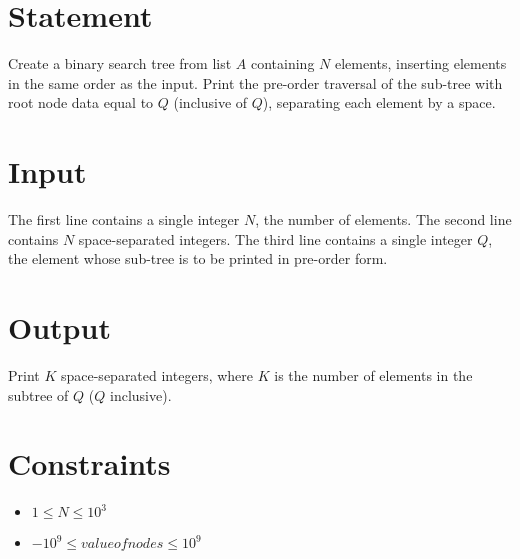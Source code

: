 \documentclass{article}
\begin{document}
\section*{Statement}

Create a binary search tree from list $A$ containing $N$ elements, inserting elements in the same order as the input. Print the pre-order traversal of the sub-tree with root node data equal to $Q$ (inclusive of $Q$), separating each element by a space.

\section*{Input}

The first line contains a single integer $N$, the number of elements. The second line contains $N$ space-separated integers. The third line contains a single integer $Q$, the element whose sub-tree is to be printed in pre-order form. 

\section*{Output}

Print $K$ space-separated integers, where $K$ is the number of elements in the subtree of $Q$ ($Q$ inclusive).

\section*{Constraints}

\begin{itemize}
    \item $1 \le N \le 10^{3}$
    \item $-10^{9} \le valueofnodes \le 10^{9}$
\end{itemize}
\end{document}
